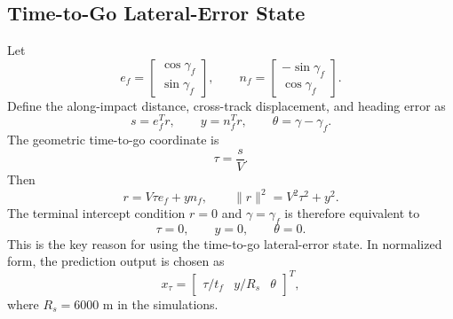 \documentclass[letterpaper,journal]{IEEEtran}
\begin{document}
\subsection{Time-to-Go Lateral-Error State}

Let
\begin{equation}
    e_f=\begin{bmatrix}\cos\gamma_f\\ \sin\gamma_f\end{bmatrix},\qquad
    n_f=\begin{bmatrix}-\sin\gamma_f\\ \cos\gamma_f\end{bmatrix}.
\end{equation}
Define the along-impact distance, cross-track displacement, and heading error as
\begin{equation}
    s=e_f^Tr,\qquad y=n_f^Tr,\qquad \theta=\gamma-\gamma_f .
\end{equation}
The geometric time-to-go coordinate is
\begin{equation}
    \tau=\frac{s}{V}.
\end{equation}
Then
\begin{equation}
    r=V\tau e_f+yn_f,\qquad
    \|r\|^2=V^2\tau^2+y^2 .
    \label{eq:r_tau_y}
\end{equation}
The terminal intercept condition $r=0$ and $\gamma=\gamma_f$ is therefore equivalent to
\begin{equation}
    \tau=0,\qquad y=0,\qquad \theta=0 .
    \label{eq:terminal_origin}
\end{equation}
This is the key reason for using the time-to-go lateral-error state. In normalized form, the prediction output is chosen as
\begin{equation}
    x_\tau=
    \begin{bmatrix}
    \tau/t_f&y/R_s&\theta
    \end{bmatrix}^T,
    \label{eq:xtau}
\end{equation}
where $R_s=6000$ m in the simulations.
\end{document}
